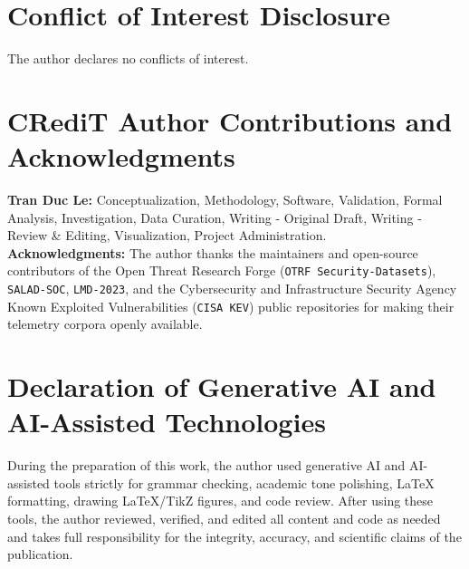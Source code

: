 \documentclass[11pt,a4paper]{article}
\begin{document}
\section*{Conflict of Interest Disclosure}
The author declares no conflicts of interest.

\section*{CRediT Author Contributions and Acknowledgments}
\textbf{Tran Duc Le:} Conceptualization, Methodology, Software, Validation, Formal Analysis, Investigation, Data Curation, Writing - Original Draft, Writing - Review \& Editing, Visualization, Project Administration.\\[0.4em]
\textbf{Acknowledgments:} The author thanks the maintainers and open-source contributors of the Open Threat Research Forge (\texttt{OTRF Security-Datasets}), \texttt{SALAD-SOC}, \texttt{LMD-2023}, and the Cybersecurity and Infrastructure Security Agency Known Exploited Vulnerabilities (\texttt{CISA KEV}) public repositories for making their telemetry corpora openly available.

\section*{Declaration of Generative AI and AI-Assisted Technologies}
During the preparation of this work, the author used generative AI and AI-assisted tools strictly for grammar checking, academic tone polishing, \LaTeX{} formatting, drawing \LaTeX{}/TikZ figures, and code review. After using these tools, the author reviewed, verified, and edited all content and code as needed and takes full responsibility for the integrity, accuracy, and scientific claims of the publication.
\end{document}
